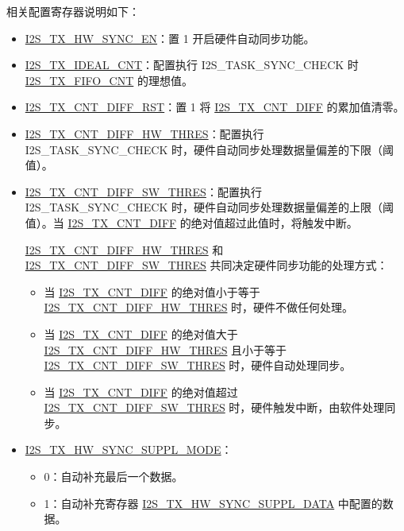 \documentclass[main\_\_CN.tex]{subfiles}
\begin{document}
相关配置寄存器说明如下：

\begin{itemize} 
    \item \hyperref[fielddesc:I2STXHWSYNCEN]{I2S\_TX\_HW\_SYNC\_EN}：置 1 开启硬件自动同步功能。
    \item \hyperref[fielddesc:I2STXIDEALCNT]{I2S\_TX\_IDEAL\_CNT}：配置执行 I2S\_TASK\_SYNC\_CHECK 时 \hyperref[fielddesc:I2STXFIFOCNT]{I2S\_TX\_FIFO\_CNT} 的理想值。
    \item \hyperref[fielddesc:I2STXCNTDIFFRST]{I2S\_TX\_CNT\_DIFF\_RST}：置 1 将 \hyperref[fielddesc:I2STXCNTDIFF]{I2S\_TX\_CNT\_DIFF} 的累加值清零。
    \item \hyperref[fielddesc:I2STXCNTDIFFHWTHRES]{I2S\_TX\_CNT\_DIFF\_HW\_THRES}：配置执行 I2S\_TASK\_SYNC\_CHECK 时，硬件自动同步处理数据量偏差的下限（阈值）。
    \item \hyperref[fielddesc:I2STXCNTDIFFSWTHRES]{I2S\_TX\_CNT\_DIFF\_SW\_THRES}：配置执行 I2S\_TASK\_SYNC\_CHECK 时，硬件自动同步处理数据量偏差的上限（阈值）。当 \hyperref[fielddesc:I2STXCNTDIFF]{I2S\_TX\_CNT\_DIFF} 的绝对值超过此值时，将触发中断。

\begin{tiplisting}
\hyperref[fielddesc:I2STXCNTDIFFHWTHRES]{I2S\_TX\_CNT\_DIFF\_HW\_THRES} 和 \hyperref[fielddesc:I2STXCNTDIFFSWTHRES]{I2S\_TX\_CNT\_DIFF\_SW\_THRES} 共同决定硬件同步功能的处理方式：
    \begin{itemize}
        \item 当 \hyperref[fielddesc:I2STXCNTDIFF]{I2S\_TX\_CNT\_DIFF} 的绝对值小于等于 \hyperref[fielddesc:I2STXCNTDIFFHWTHRES]{I2S\_TX\_CNT\_DIFF\_HW\_THRES} 时，硬件不做任何处理。
        \item 当 \hyperref[fielddesc:I2STXCNTDIFF]{I2S\_TX\_CNT\_DIFF} 的绝对值大于 \hyperref[fielddesc:I2STXCNTDIFFHWTHRES]{I2S\_TX\_CNT\_DIFF\_HW\_THRES} 且小于等于\\ \hyperref[fielddesc:I2STXCNTDIFFSWTHRES]{I2S\_TX\_CNT\_DIFF\_SW\_THRES} 时，硬件自动处理同步。
        \item 当 \hyperref[fielddesc:I2STXCNTDIFF]{I2S\_TX\_CNT\_DIFF} 的绝对值超过 \hyperref[fielddesc:I2STXCNTDIFFSWTHRES]{I2S\_TX\_CNT\_DIFF\_SW\_THRES} 时，硬件触发中断，由软件处理同步。
    \end{itemize}
\end{tiplisting}

    \item \hyperref[fielddesc:I2STXHWSYNCSUPPLMODE]{I2S\_TX\_HW\_SYNC\_SUPPL\_MODE}：
    \begin{itemize}
        \item 0：自动补充最后一个数据。
        \item 1：自动补充寄存器 \hyperref[fielddesc:I2STXHWSYNCSUPPLDATA]{I2S\_TX\_HW\_SYNC\_SUPPL\_DATA} 中配置的数据。
    \end{itemize}
\end{itemize}
\end{document}
